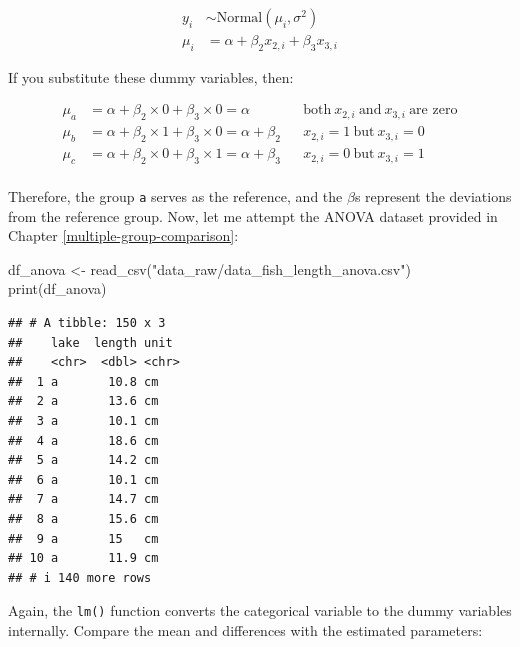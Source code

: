 \documentclass[
]{book}
\newenvironment{Shaded}{\begin{snugshade}}{\end{snugshade}}
\newcommand{\FunctionTok}[1]{\textcolor[rgb]{0.00,0.00,0.00}{#1}}
\newcommand{\NormalTok}[1]{#1}
\newcommand{\OtherTok}[1]{\textcolor[rgb]{0.56,0.35,0.01}{#1}}
\newcommand{\StringTok}[1]{\textcolor[rgb]{0.31,0.60,0.02}{#1}}
\begin{document}
\[
\begin{aligned}
y_i &\sim \text{Normal}(\mu_i, \sigma^2)\\
\mu_i &= \alpha + \beta_{2} x_{2,i}  + \beta_{3} x_{3,i}
\end{aligned}
\]

If you substitute these dummy variables, then:

\[
\begin{aligned}
\mu_a &= \alpha + \beta_2 \times 0 + \beta_3 \times 0 = \alpha &&\text{both}~x_{2,i}~\text{and}~x_{3,i}~\text{are zero}\\
\mu_b &= \alpha + \beta_2 \times 1 + \beta_3 \times 0 = \alpha + \beta_2 &&x_{2,i} = 1~\text{but}~x_{3,i}=0\\
\mu_c &= \alpha + \beta_2 \times 0 + \beta_3 \times 1 = \alpha + \beta_3 &&x_{2,i} = 0~\text{but}~x_{3,i}=1\\
\end{aligned}
\]

Therefore, the group \texttt{a} serves as the reference, and the \(\beta\)s represent the deviations from the reference group. Now, let me attempt the ANOVA dataset provided in Chapter \ref{multiple-group-comparison}:

\begin{Shaded}
\begin{Highlighting}[]
\NormalTok{df\_anova }\OtherTok{\textless{}{-}} \FunctionTok{read\_csv}\NormalTok{(}\StringTok{"data\_raw/data\_fish\_length\_anova.csv"}\NormalTok{)}
\FunctionTok{print}\NormalTok{(df\_anova)}
\end{Highlighting}
\end{Shaded}

\begin{verbatim}
## # A tibble: 150 x 3
##    lake  length unit 
##    <chr>  <dbl> <chr>
##  1 a       10.8 cm   
##  2 a       13.6 cm   
##  3 a       10.1 cm   
##  4 a       18.6 cm   
##  5 a       14.2 cm   
##  6 a       10.1 cm   
##  7 a       14.7 cm   
##  8 a       15.6 cm   
##  9 a       15   cm   
## 10 a       11.9 cm   
## # i 140 more rows
\end{verbatim}

Again, the \texttt{lm()} function converts the categorical variable to the dummy variables internally. Compare the mean and differences with the estimated parameters:
\end{document}
